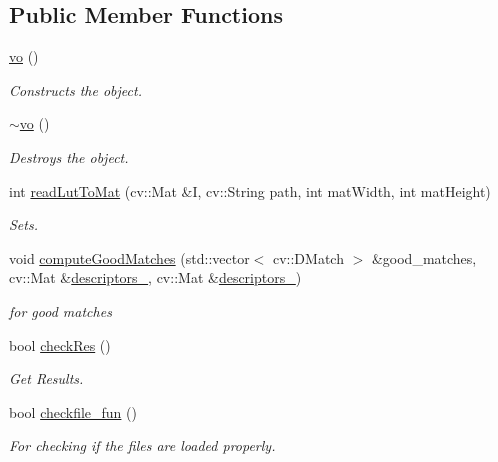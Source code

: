 \subsection*{Public Member Functions}
\begin{DoxyCompactItemize}
\item 
\hyperlink{classvo_a572a78091387cd798dbb61eb76fc7c19}{vo} ()
\begin{DoxyCompactList}\small\item\em Constructs the object. \end{DoxyCompactList}\item 
\hyperlink{classvo_a3ecdcb7d44c7d1f2972bb5cbf0e2f55f}{$\sim$vo} ()
\begin{DoxyCompactList}\small\item\em Destroys the object. \end{DoxyCompactList}\item 
int \hyperlink{classvo_a33defbce61461f3af27ea2d16d908266}{read\+Lut\+To\+Mat} (cv\+::\+Mat \&I, cv\+::\+String path, int mat\+Width, int mat\+Height)
\begin{DoxyCompactList}\small\item\em Sets. \end{DoxyCompactList}\item 
void \hyperlink{classvo_ade4e64203a99ab3760f15c2af3449ba4}{compute\+Good\+Matches} (std\+::vector$<$ cv\+::\+D\+Match $>$ \&good\+\_\+matches, cv\+::\+Mat \&\hyperlink{classvo_a927e2c8dd06a377ee2a129b560b2304a}{descriptors\+\_}, cv\+::\+Mat \&\hyperlink{classvo_ac5f6dcad86a52c20957698e3fd8d43c1}{descriptors\+\_})
\begin{DoxyCompactList}\small\item\em for good matches \end{DoxyCompactList}\item 
bool \hyperlink{classvo_a870e05250f7bea1f438bee3f68e3e7a4}{check\+Res} ()
\begin{DoxyCompactList}\small\item\em Get Results. \end{DoxyCompactList}\item 
bool \hyperlink{classvo_a326b991afda611a12fccfbdb54c5273e}{checkfile\+\_\+fun} ()
\begin{DoxyCompactList}\small\item\em For checking if the files are loaded properly. \end{DoxyCompactList}\end{DoxyCompactItemize}
